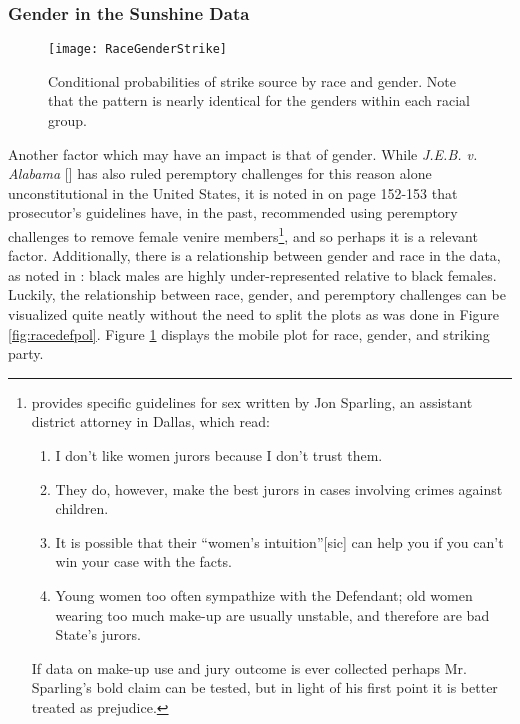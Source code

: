 \subsubsection{Gender in the Sunshine Data}

\begin{figure}[h!]
  \centering
  \texttt{[image: RaceGenderStrike]}
  \caption[Strikes by Race and Gender (Sunshine)]
  {\footnotesize Conditional probabilities of strike source by race and gender. Note that the pattern is nearly identical for the genders within
    each racial group.} \label{fig:racegenpol}
\end{figure}

Another factor which may have an impact is that of gender. While \textit{J.E.B. v. Alabama} [\cite{jebvalabama}] has also ruled
peremptory challenges for this reason alone unconstitutional in the United States, it is noted in \cite{vandykejurysel} on page
152-153 that prosecutor's guidelines have, in the past, recommended using peremptory challenges to remove female venire
members\footnote{\citeauthor{vandykejurysel} provides specific guidelines for sex written by Jon Sparling, an assistant district
  attorney in Dallas, which read: \begin{enumerate} 
  \item I don't like women jurors because I don't trust them.
  \item They do, however, make the best jurors in cases involving crimes against children.
  \item It is possible that their ``women's intuition''[sic] can help you if you can't win your case with the facts.
  \item Young women too often sympathize with the Defendant; old women wearing too much make-up are usually unstable, and
    therefore are bad State's jurors.
  \end{enumerate}
  If data on make-up use and jury outcome is ever collected perhaps Mr. Sparling's bold claim can be tested, but in light of
  his first point it is better treated as prejudice.}, and so perhaps it is a relevant factor. Additionally, there is a
relationship between gender and race in the data, as noted in \cite{JurySunshineProj}: black males are highly under-represented
relative to black females. Luckily, the relationship between race, gender, and peremptory challenges can be visualized quite
neatly without the need to split the plots as was done in Figure \ref{fig:racedefpol}. Figure \ref{fig:racegenpol} displays the
mobile plot for race, gender, and striking party.


